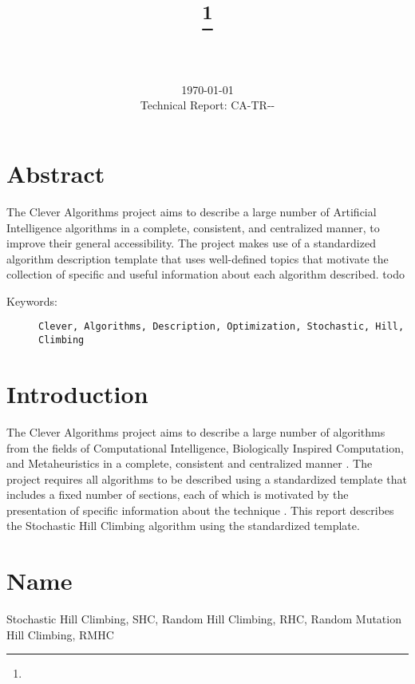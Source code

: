 \documentclass[a4paper, 11pt]{article}
\title{{\myreporttitle}\footnote{\myreportlicense}}
\author{\myreportauthor\\{\myreportemail}\\\small\myreportproject}
\date{\today\\{\small{Technical Report: CA-TR-{\myreportdate}-\myreportversion}}}
\begin{document}
\maketitle

\section*{Abstract} 
The Clever Algorithms project aims to describe a large number of Artificial Intelligence algorithms in a complete, consistent, and centralized manner, to improve their general accessibility. 
The project makes use of a standardized algorithm description template that uses well-defined topics that motivate the collection of specific and useful information about each algorithm described.
todo

\begin{description}
	\item[Keywords:] {\small\texttt{Clever, Algorithms, Description, Optimization, Stochastic, Hill, Climbing}}
\end{description} 

\section{Introduction} 
\label{sec:intro}
The Clever Algorithms project aims to describe a large number of algorithms from the fields of Computational Intelligence, Biologically Inspired Computation, and Metaheuristics in a complete, consistent and centralized manner \cite{Brownlee2010}.
The project requires all algorithms to be described using a standardized template that includes a fixed number of sections, each of which is motivated by the presentation of specific information about the technique \cite{Brownlee2010a}.
This report describes the Stochastic Hill Climbing algorithm using the standardized template.

\section{Name} 
\label{sec:name}
Stochastic Hill Climbing, SHC, Random Hill Climbing, RHC, Random Mutation Hill Climbing, RMHC 
\end{document}
